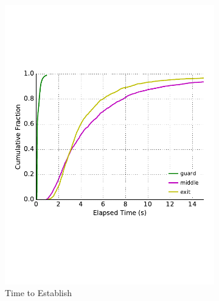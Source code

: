 \begin{figure} \centering
	\begin{subfigure}[t]{0.32\textwidth} \centering
\includegraphics[trim={0 3cm 0 3cm}, clip, width=1.0\textwidth]{images/payment_establish.pdf}
		\caption{Time to Establish}
\label{fig:payments_establish}
	\end{subfigure}
	\begin{subfigure}[t]{0.32\textwidth} \centering

\end{subfigure}
\end{figure}
